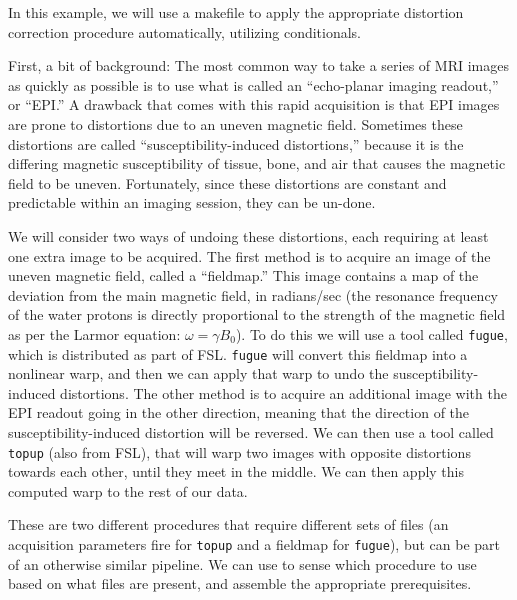 
In this example, we will use a makefile to apply the appropriate distortion correction procedure automatically, utilizing conditionals.

First, a bit of background: The most common way to take a series of MRI images as quickly as possible is to use what is called an ``echo-planar imaging readout,'' or ``EPI.'' A drawback that comes with this rapid acquisition is that EPI images are prone to distortions due to an uneven magnetic field. Sometimes these distortions are called ``susceptibility-induced distortions,'' because it is the differing magnetic susceptibility of tissue, bone, and air that causes the magnetic field to be uneven. Fortunately, since these distortions are constant and predictable within an imaging session, they can be un-done.

We will consider two ways of undoing these distortions, each requiring at least one extra image to be acquired. The first method is to acquire an image of the uneven magnetic field, called a ``fieldmap.'' This image contains a map of the deviation from the main magnetic field, in radians/sec (the resonance frequency of the water protons is directly proportional to the strength of the magnetic field as per the Larmor equation: $\omega=\gamma B _{0}$). To do this we will use a tool called \texttt{fugue}, which is distributed as part of FSL. \texttt{fugue} will convert this fieldmap into a nonlinear warp, and then we can apply that warp to undo the susceptibility-induced distortions. The other method is to acquire an additional image with the EPI readout going in the other direction, meaning that the direction of the susceptibility-induced distortion will be reversed. We can then use a tool called \texttt{topup} (also from FSL), that will warp two images with opposite distortions towards each other, until they meet in the middle. We can then apply this computed warp to the rest of our data.

These are two different procedures that require different sets of files (an acquisition parameters fire for \texttt{topup} and a fieldmap for \texttt{fugue}), but can be part of an otherwise similar pipeline. We can use \maken{} to sense which procedure to use based on what files are present, and assemble the appropriate prerequisites.


